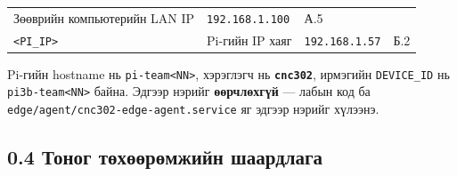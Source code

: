 \begin{longtable}[]{@{}llll@{}}
\begin{minipage}[t]{0.22\columnwidth}
Зөөврийн компьютерийн LAN IP\strut
\end{minipage} & \begin{minipage}[t]{0.22\columnwidth}\raggedright
\texttt{192.168.1.100}\strut
\end{minipage} & \begin{minipage}[t]{0.22\columnwidth}\raggedright
А.5\strut
\end{minipage}\tabularnewline
\begin{minipage}[t]{0.22\columnwidth}\raggedright
\texttt{\textless{}PI\_\allowbreak{}IP\textgreater{}}\strut
\end{minipage} & \begin{minipage}[t]{0.22\columnwidth}\raggedright
Pi-гийн IP хаяг\strut
\end{minipage} & \begin{minipage}[t]{0.22\columnwidth}\raggedright
\texttt{192.168.1.57}\strut
\end{minipage} & \begin{minipage}[t]{0.22\columnwidth}\raggedright
Б.2\strut
\end{minipage}\tabularnewline
\bottomrule
\end{longtable}\endgroup

Pi-гийн hostname нь \texttt{pi-team\textless{}NN\textgreater{}}, хэрэглэгч нь \textbf{\texttt{cnc302}}, ирмэгийн \texttt{DEVICE\_ID} нь \texttt{pi3b-team\textless{}NN\textgreater{}} байна. Эдгээр нэрийг \textbf{өөрчлөхгүй} --- лабын код ба \texttt{edge/\allowbreak{}agent/\allowbreak{}cnc302-edge-agent.\allowbreak{}service} яг эдгээр нэрийг хүлээнэ.

\hypertarget{ux442ux43eux43dux43eux433-ux442ux4e9ux445ux4e9ux4e9ux440ux4e9ux43cux436ux438ux439ux43d-ux448ux430ux430ux440ux434ux43bux430ux433ux430}{%
\subsection{0.4 Тоног төхөөрөмжийн шаардлага}\label{ux442ux43eux43dux43eux433-ux442ux4e9ux445ux4e9ux4e9ux440ux4e9ux43cux436ux438ux439ux43d-ux448ux430ux430ux440ux434ux43bux430ux433ux430}}

